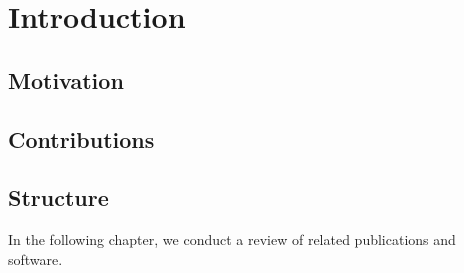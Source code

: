 
\chapter{Introduction}\label{ch:introduction}
\glsresetall %

\section{Motivation}

\section{Contributions}

\section{Structure}
In the following chapter, we conduct a review of related publications and software. 
